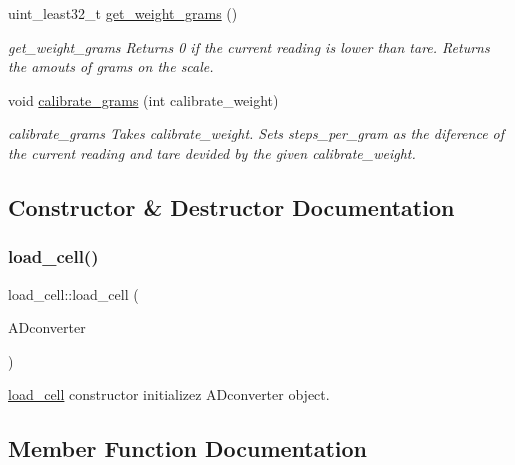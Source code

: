 \begin{DoxyCompactItemize}
uint\+\_\+least32\+\_\+t \hyperlink{classload__cell_a60bd12b615cc95061a3ae7f62bf816e3}{get\+\_\+weight\+\_\+grams} ()
\begin{DoxyCompactList}\small\item\em get\+\_\+weight\+\_\+grams Returns 0 if the current reading is lower than tare. Returns the amouts of grams on the scale. \end{DoxyCompactList}\item 
void \hyperlink{classload__cell_a2a8d1046ce6e0ce4ea7e0210a4521128}{calibrate\+\_\+grams} (int calibrate\+\_\+weight)
\begin{DoxyCompactList}\small\item\em calibrate\+\_\+grams Takes \textquotesingle{}calibrate\+\_\+weight\textquotesingle{}. Sets \textquotesingle{}steps\+\_\+per\+\_\+gram\textquotesingle{} as the diference of the current reading and tare devided by the given \textquotesingle{}calibrate\+\_\+weight\textquotesingle{}. \end{DoxyCompactList}\end{DoxyCompactItemize}


\subsection{Constructor \& Destructor Documentation}
\mbox{\label{classload__cell_a7b0d68fac5e159c15a729e75bd39e646}} 
\subsubsection{\texorpdfstring{load\+\_\+cell()}{load\_cell()}}
{\footnotesize\ttfamily load\+\_\+cell\+::load\+\_\+cell (\begin{DoxyParamCaption}\item[{\hyperlink{class_h_x711}{H\+X711} \&}]{A\+Dconverter }\end{DoxyParamCaption})}



\hyperlink{classload__cell}{load\+\_\+cell} constructor initializez A\+Dconverter object. 



\subsection{Member Function Documentation}
\mbox{\label{classload__cell_a2a8d1046ce6e0ce4ea7e0210a4521128}} 
